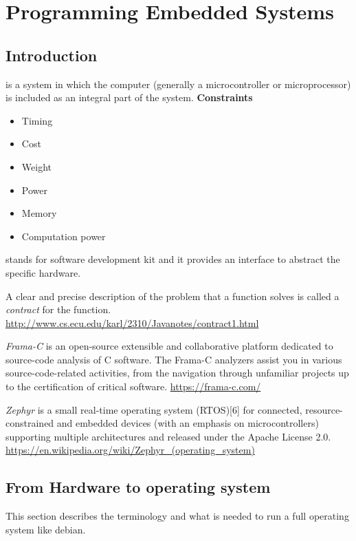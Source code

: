 \chapter{Programming Embedded Systems}

\section{Introduction}
 is a system in which the computer (generally a microcontroller or microprocessor) is included as an integral part of the system.
\textbf{Constraints}
\begin{itemize}
    \item Timing 
    \item Cost 
    \item Weight 
    \item Power 
    \item Memory
    \item Computation power
\end{itemize}

 stands for software development kit and it provides an interface to abstract the specific hardware.

A clear and precise description of the problem that a function solves is called a \textit{contract} for the function.
\url{http://www.cs.ecu.edu/karl/2310/Javanotes/contract1.html}

\textit{Frama-C} is an open-source extensible and collaborative platform dedicated to source-code analysis of C software. The Frama-C analyzers assist you in various source-code-related activities, from the navigation through unfamiliar projects up to the certification of critical software. 
\url{https://frama-c.com/}

\textit{Zephyr} is a small real-time operating system (RTOS)[6] for connected, resource-constrained and embedded devices (with an emphasis on microcontrollers) supporting multiple architectures and released under the Apache License 2.0.
\url{https://en.wikipedia.org/wiki/Zephyr_(operating_system)}


\section{From Hardware to operating system}
This section describes the terminology and what is needed to run 
a full operating system like debian.



